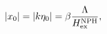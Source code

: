 \begin{equation}
|x_0| = |k\eta_{0}| =  \beta \frac{\Lambda}{H_{\rm ex}^{\rm NPH}},
\label{NPH}
\end{equation}

